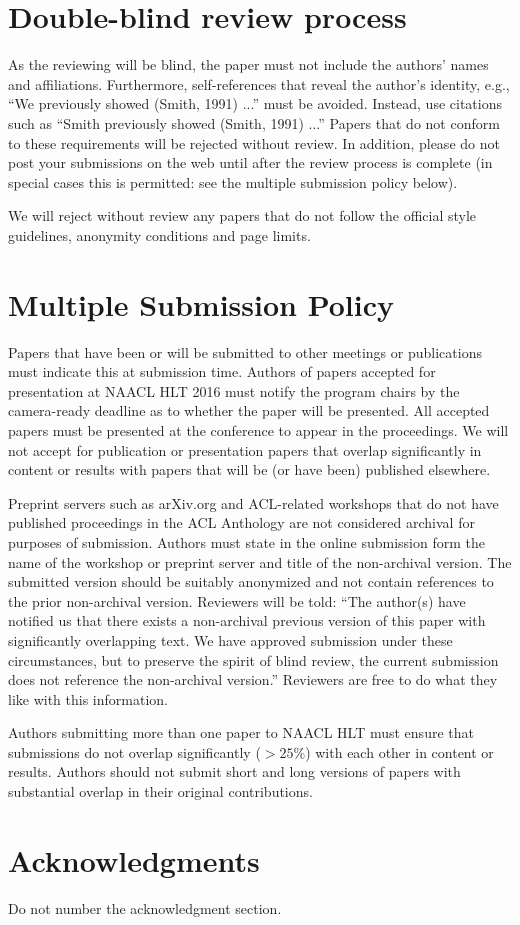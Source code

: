 \documentclass{article}
\begin{document}
\section{Double-blind review process}
\label{sec:blind}

As the reviewing will be blind, the paper must not include the
authors' names and affiliations.  Furthermore, self-references that
reveal the author's identity, e.g., ``We previously showed (Smith,
1991) ...'' must be avoided. Instead, use citations such as ``Smith
previously showed (Smith, 1991) ...'' Papers that do not conform to
these requirements will be rejected without review. In addition,
please do not post your submissions on the web until after the
review process is complete (in special cases this is permitted: see 
the multiple submission policy below).

We will reject without review any papers that do not follow the
official style guidelines, anonymity conditions and page limits.

\section{Multiple Submission Policy}

Papers that have been or will be submitted to other meetings or
publications must indicate this at submission time. Authors of
papers accepted for presentation at NAACL HLT 2016 must notify the
program chairs by the camera-ready deadline as to whether the paper
will be presented. All accepted papers must be presented at the
conference to appear in the proceedings. We will not accept for
publication or presentation papers that overlap significantly in
content or results with papers that will be (or have been) published
elsewhere.

Preprint servers such as arXiv.org and ACL-related workshops that
do not have published proceedings in the ACL Anthology are not
considered archival for purposes of submission. Authors must state
in the online submission form the name of the workshop or preprint
server and title of the non-archival version.  The submitted version
should be suitably anonymized and not contain references to the
prior non-archival version. Reviewers will be told: ``The author(s)
have notified us that there exists a non-archival previous version
of this paper with significantly overlapping text. We have approved
submission under these circumstances, but to preserve the spirit
of blind review, the current submission does not reference the
non-archival version.'' Reviewers are free to do what they like with
this information.

Authors submitting more than one paper to NAACL HLT must ensure
that submissions do not overlap significantly ($>25\%$) with each other
in content or results. Authors should not submit short and long
versions of papers with substantial overlap in their original
contributions.

\section*{Acknowledgments}

Do not number the acknowledgment section.
\end{document}
